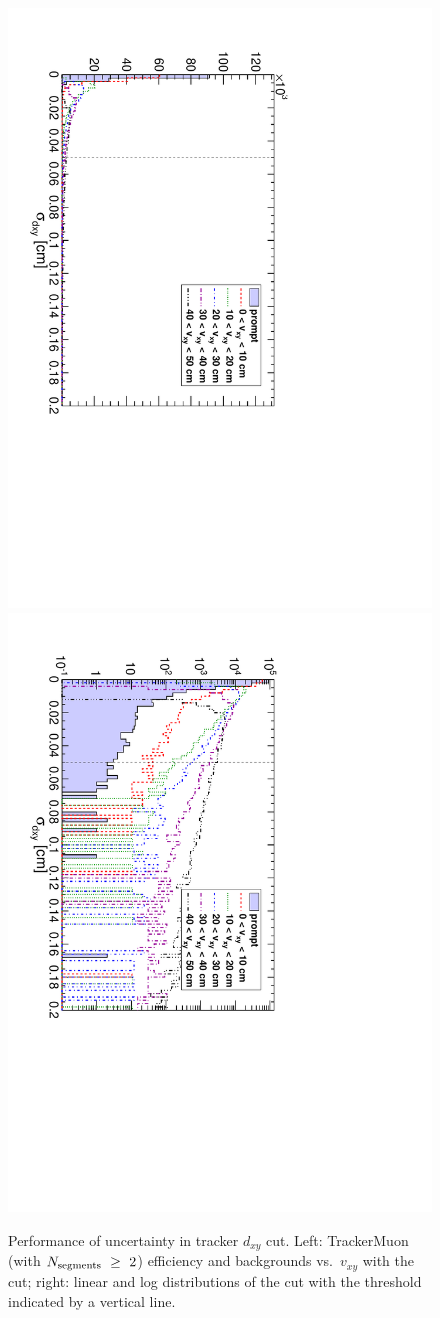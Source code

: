 \documentclass[12pt]{article}
\newcommand{\s}[1]{{\mbox{\scriptsize #1}}}
\begin{document}
\begin{figure}
\begin{center}
\begin{multicols}{2}
\includegraphics[height=\linewidth, angle=90]{fig/backgrounds3_plot/trackslinear_dxyerr.pdf}
\includegraphics[height=\linewidth, angle=90]{fig/backgrounds3_plot/trackslog_dxyerr.pdf}
\end{multicols}

\caption{Performance of uncertainty in tracker $d_{xy}$ cut.  Left: TrackerMuon (with $N_\s{segments}~\ge~2$) efficiency and backgrounds vs.\ $v_{xy}$ with the cut; right: linear and log distributions of the cut with the threshold indicated by a vertical line. \label{fig:dxyerr}}
\end{center}
\end{figure}
\end{document}
